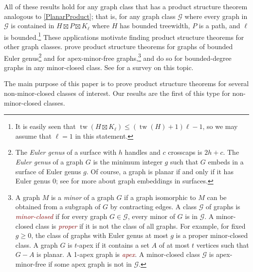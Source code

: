 \documentclass{patmorin}
\theoremstyle{plain}
\theoremstyle{definition}
\newcommand{\defin}[1]{\textcolor{Maroon}{\emph{#1}}}
\newcommand{\note}[2]{\noindent{\color{red}[#1:~#2]}}
\DeclareMathOperator{\tw}{tw}
\renewcommand{\geq}{\geqslant}
\renewcommand{\leq}{\leqslant}
\begin{document}


All of these results hold for any graph class that has a product structure theorem analogous to \cref{PlanarProduct}; that is, for any graph class  $\mathcal{G}$ where every graph in $\mathcal{G}$ is contained in $H\boxtimes P\boxtimes K_\ell$ where $H$ has bounded treewidth, $P$ is a path, and $\ell$ is bounded.\footnote{It is easily seen that $\tw(H\boxtimes K_\ell) \leq (\tw(H)+1)\ell-1$, so we may assume that $\ell=1$ in this statement.} These applications motivate finding product structure theorems for other graph classes. \citet{DJMMUW20} prove product structure theorems for graphs of bounded Euler genus\footnote{The \textit{Euler genus} of a surface with $h$ handles and $c$ crosscaps is $2h+c$. The \textit{Euler genus} of a graph $G$ is the minimum integer $g$ such that $G$ embeds in a surface of Euler genus $g$. Of course, a graph is planar if and only if it has Euler genus 0; see \citep{mohar.thomassen:graphs} for more about graph embeddings in surfaces.} and for apex-minor-free graphs,\footnote{A graph $M$ is a \textit{minor} of a graph $G$ if a graph isomorphic to $M$ can be obtained from a subgraph of $G$ by contracting edges. A class $\mathcal{G}$ of graphs is \defin{minor-closed} if for every graph $G\in\mathcal{G}$, every minor of $G$ is in $\mathcal{G}$. A minor-closed class is \defin{proper} if it is not the class of all graphs. For example, for fixed $g\geq 0$, the class of graphs with Euler genus at most $g$ is a proper minor-closed class. A graph $G$ is $t$-apex if it contains a set $A$ of at most $t$ vertices such that $G-A$ is planar. A 1-apex graph is \defin{apex}.  A minor-closed class $\mathcal{G}$ is apex-minor-free if some apex graph is not in $\mathcal{G}$.} and \citet{DEMWW22} do so for bounded-degree graphs in any minor-closed class. See
\citep{DHJLW21} for a survey on this topic.

The main purpose of this paper is to prove product structure theorems for several non-minor-closed classes of interest. Our results are the first of this type for non-minor-closed classes.
\end{document}
